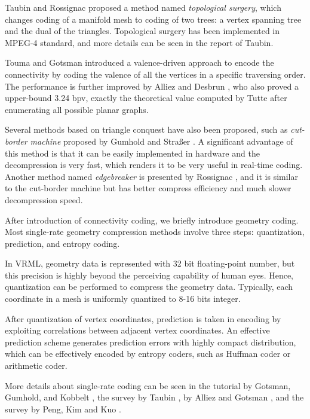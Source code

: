 \documentclass[11pt, a4paper]{report}
\begin{document}
    Taubin and Rossignac \cite{274365} proposed a method named
    \emph{topological surgery}, which changes coding of a manifold
    mesh to coding of two trees: a vertex spanning tree and the dual of the triangles.
    Topological surgery has been implemented in MPEG-4 standard, and more details
    can be seen in the report of Taubin\cite{3d:Taubin}.
    
    Touma and Gotsman \cite{triangle:Touma} introduced a
    valence-driven approach to encode the connectivity by coding the
    valence of all the vertices in a specific traversing order. 
    The performance is further improved
    by Alliez and Desbrun \cite{alliez01valencedriven}, who also proved a
    upper-bound 3.24 bpv, exactly the theoretical value computed
    by Tutte \cite{census:Tutte} after enumerating all possible planar
    graphs.

    Several methods based on triangle conquest have also been
    proposed, such as \emph{cut-border machine} proposed by 
    Gumhold and Stra\ss{}er \cite{280836}.
    A significant advantage of this method is that it can be easily implemented
    in hardware and the decompression is very fast, which
    renders it to be very useful in real-time coding. 
    Another method named \emph{edgebreaker} is presented by Rossignac \cite{614421},
    and it is similar to the cut-border machine but has better
    compress efficiency and much slower decompression speed.
    
    After introduction of connectivity coding, we briefly introduce geometry
    coding. Most single-rate geometry compression methods involve three steps:
    quantization, prediction, and entropy coding.

    In VRML, geometry data is represented with 32 bit floating-point
    number, but this precision is highly beyond the perceiving
    capability of human eyes. Hence, quantization can be performed to
    compress the geometry data. Typically, each coordinate in a mesh is
    uniformly quantized to 8-16 bits integer.

    After quantization of vertex coordinates, prediction is taken in
    encoding by exploiting correlations between adjacent vertex
    coordinates. An effective prediction scheme generates prediction
    errors with highly compact distribution, which can be effectively
    encoded by entropy coders, such as Huffman coder or arithmetic
    coder. 

    More details about single-rate coding can be seen in the tutorial
    by Gotsman, Gumhold, and Kobbelt \cite{gotsman-simplification},
    the survey by Taubin \cite{3d:Taubin}, by Alliez and Gotsman
    \cite{recent:alliez}, and the survey by Peng, Kim and Kuo
    \cite{technologies:peng}.
    
\end{document}
